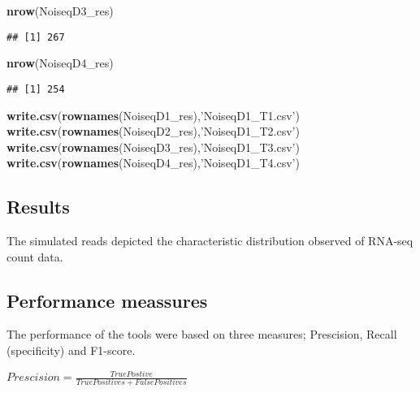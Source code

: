 \documentclass[]{article}
\newenvironment{Shaded}{\begin{snugshade}}{\end{snugshade}}
\newcommand{\KeywordTok}[1]{\textcolor[rgb]{0.13,0.29,0.53}{\textbf{#1}}}
\newcommand{\NormalTok}[1]{#1}
\newcommand{\StringTok}[1]{\textcolor[rgb]{0.31,0.60,0.02}{#1}}
\begin{document}
\begin{Shaded}
\begin{Highlighting}[]
\KeywordTok{nrow}\NormalTok{(NoiseqD3_res)}
\end{Highlighting}
\end{Shaded}

\begin{verbatim}
## [1] 267
\end{verbatim}

\begin{Shaded}
\begin{Highlighting}[]
\KeywordTok{nrow}\NormalTok{(NoiseqD4_res)}
\end{Highlighting}
\end{Shaded}

\begin{verbatim}
## [1] 254
\end{verbatim}

\begin{Shaded}
\begin{Highlighting}[]
\KeywordTok{write.csv}\NormalTok{(}\KeywordTok{rownames}\NormalTok{(NoiseqD1_res),}\StringTok{'NoiseqD1_T1.csv'}\NormalTok{)}
\KeywordTok{write.csv}\NormalTok{(}\KeywordTok{rownames}\NormalTok{(NoiseqD2_res),}\StringTok{'NoiseqD1_T2.csv'}\NormalTok{)}
\KeywordTok{write.csv}\NormalTok{(}\KeywordTok{rownames}\NormalTok{(NoiseqD3_res),}\StringTok{'NoiseqD1_T3.csv'}\NormalTok{)}
\KeywordTok{write.csv}\NormalTok{(}\KeywordTok{rownames}\NormalTok{(NoiseqD4_res),}\StringTok{'NoiseqD1_T4.csv'}\NormalTok{)}
\end{Highlighting}
\end{Shaded}

\hypertarget{results}{%
\subsection{Results}\label{results}}

The simulated reads depicted the characteristic distribution observed of
RNA-seq count data.

\hypertarget{performance-meassures}{%
\subsection{Performance meassures}\label{performance-meassures}}

The performance of the tools were based on three measures; Prescision,
Recall (specificity) and F1-score.

\(Prescision= \frac{True Postive}{True Positives + False Positives}\)
\end{document}
